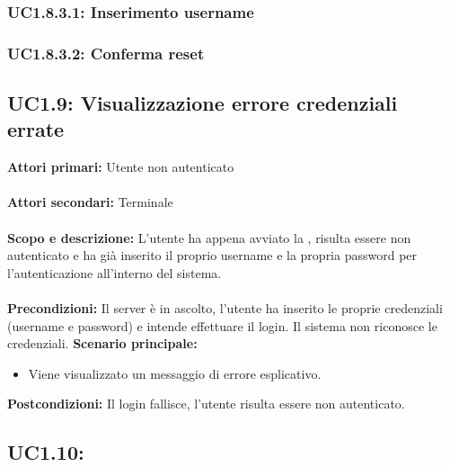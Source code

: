 \documentclass{scalatekids-article}
\begin{document}
\subsubsection{UC1.8.3.1: Inserimento username}

\subsubsection{UC1.8.3.2: Conferma reset}

\subsection{UC1.9: Visualizzazione errore credenziali errate}

\textbf{Attori primari:} Utente non autenticato\\ \\
\textbf{Attori secondari:} Terminale\\ \\
\textbf{Scopo e descrizione:}
L'utente ha appena avviato la , risulta essere non autenticato e ha già inserito il proprio username e la propria password per l'autenticazione all'interno del sistema.\\ \\
\textbf{Precondizioni:} Il server è in ascolto, l'utente ha inserito le proprie credenziali (username e password) e intende effettuare il login. Il sistema non riconosce le credenziali.
\textbf{Scenario principale:}
\begin{itemize}
  \item Viene visualizzato un messaggio di errore esplicativo.
\end{itemize}
\textbf{Postcondizioni:} Il login fallisce, l'utente risulta essere non autenticato.

\subsection{UC1.10: }


\end{document}
